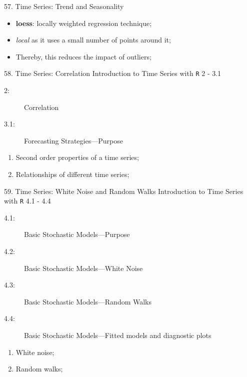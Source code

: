\begin{CHPT_SUMM_AUTO}[label = {L.-57}]{57. Time Series: Trend and Seasonality}
\begin{description}
\begin{itemize}
		\end{itemize}
		\begin{itemize}
		\item	\textbf{loess}: locally weighted regression technique;
		\item[]	\og \textit{local} \fg{} as it uses a \og small \fg{}  number of points \og around \fg{}  it;
		\item[]	Thereby, this reduces the impact of outliers;
		\end{itemize}
\end{description}
\tcbline
\end{CHPT_SUMM_AUTO}

\begin{CHPT_SUMM_AUTO}[label = {L.-58}]{58. Time Series: Correlation}
Introduction to Time Series with \texttt{R} 2 - 3.1
\begin{description}
	\item[2:]	Correlation
	\item[3.1:]	Forecasting Strategies---Purpose
\end{description}
\tcbline
	\begin{enumerate}
		\item	Second order properties of a time series;
		\item	Relationships of different time series;
	\end{enumerate}
\end{CHPT_SUMM_AUTO}

\begin{CHPT_SUMM_AUTO}[label = {L.-59}]{59. Time Series: White Noise and Random Walks}
Introduction to Time Series with \texttt{R} 4.1 - 4.4
\begin{description}
	\item[4.1:]	Basic Stochastic Models---Purpose
	\item[4.2:]	Basic Stochastic Models---White Noise
	\item[4.3:]	Basic Stochastic Models---Random Walks
	\item[4.4:]	Basic Stochastic Models---Fitted models and diagnostic plots
\end{description}
\tcbline
	\begin{enumerate}
		\item	White noise;
		\item	Random walks;
	\end{enumerate}
\end{CHPT_SUMM_AUTO}

